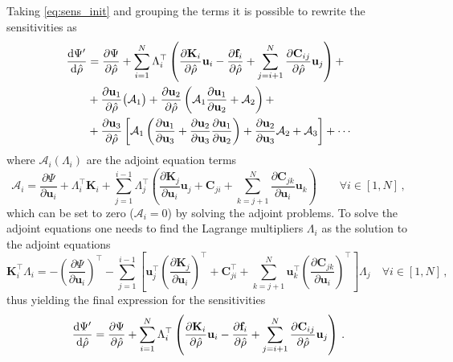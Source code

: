 Taking \autoref{eq:sens_init} and grouping the terms it is possible to rewrite the sensitivities as
\begin{align}
    \frac{\mathop{}\!\text{d} \Psi^\prime}{\mathop{}\!\text{d} \hat{\rho}}  &= \frac{\partial \Psi}{\partial \hat{\rho}} + \sum^N_{i=1} \Lambda_{i}^{\top} \left( \frac{\partial \mathbf{K}_i}{\partial \hat{\rho}} \mathbf{u}_i - \frac{\partial \mathbf{f}_i}{\partial \hat{\rho}} + \sum_{j=i+1}^{N} \frac{\partial \mathbf{C}_{ij}}{\partial \hat{\rho} } \mathbf{u}_j \right) + \\ &+ \frac{\partial \mathbf{u}_1}{\partial \hat{\rho}} \big( \mathcal{A}_1 \big) + \frac{\partial \mathbf{u}_2}{\partial \hat{\rho}} \left( \mathcal{A}_1 \frac{\partial \mathbf{u}_1}{\partial \mathbf{u}_2} + \mathcal{A}_2 \right) + \\
    &+ \frac{\partial \mathbf{u}_3}{\partial \hat{\rho}} \left[ \mathcal{A}_1 \left( \frac{\partial \mathbf{u}_1}{\partial \mathbf{u}_3} + \frac{\partial \mathbf{u}_2}{\partial \mathbf{u}_3}\frac{\partial \mathbf{u}_1}{\partial \mathbf{u}_2}\right) + \frac{\partial \mathbf{u}_2}{\partial \mathbf{u}_3} \mathcal{A}_2 + \mathcal{A}_3 \right] + \cdots
\end{align}
where $\mathcal{A}_i (\Lambda_i)$ are the adjoint equation terms
\begin{equation}
    \mathcal{A}_i = \frac{\partial \Psi}{\partial \mathbf{u}_i} + \Lambda_{i}^\top \mathbf{K}_i + \sum_{j=1}^{i-1} \Lambda_j^\top\left(
     \frac{\partial \mathbf{K}_j}{\partial \mathbf{u}_i}\mathbf{u}_j + \mathbf{C}_{ji} + \sum^N_{k=j+1} \frac{\partial \mathbf{C}_{jk}}{\partial \mathbf{u}_i} \mathbf{u}_k  \right) \quad \quad \forall i \in [1, N] \,,
\end{equation}
which can be set to zero ($\mathcal{A}_i=0$) by solving the adjoint problems. 
To solve the adjoint equations one needs to find the Lagrange multipliers $\Lambda_i$ as the solution to the adjoint equations
\begin{equation}\label{eq:app_adj_eqs}
     \mathbf{K}^\top_i \Lambda_i = -\left(\frac{\partial \Psi}{\partial \mathbf{u}_i}\right)^\top - \sum_{j=1}^{i-1} \left[ 
     \mathbf{u}^\top_j \left(\frac{\partial \mathbf{K}_j}{\partial \mathbf{u}_i}\right)^\top + \mathbf{C}^\top_{ji} + \sum^N_{k=j+1} \mathbf{u}^\top_k \left(\frac{\partial \mathbf{C}_{jk}}{\partial \mathbf{u}_i}\right)^\top \right]\Lambda_j  \quad \forall i \in [1, N] \,,
\end{equation}
thus yielding the final expression for the sensitivities
\begin{equation}
    \frac{\mathop{}\!\text{d} \Psi^\prime}{\mathop{}\!\text{d} \hat{\rho}}  = \frac{\partial \Psi}{\partial \hat{\rho}} + \sum^N_{i=1} \Lambda_{i}^{\top} \left( \frac{\partial \mathbf{K}_i}{\partial \hat{\rho}} \mathbf{u}_i - \frac{\partial \mathbf{f}_i}{\partial \hat{\rho}} + \sum^N_{j=i+1} \frac{\partial \mathbf{C}_{ij}}{\partial \hat{\rho}} \mathbf{u}_j \right)\,.
\end{equation}
